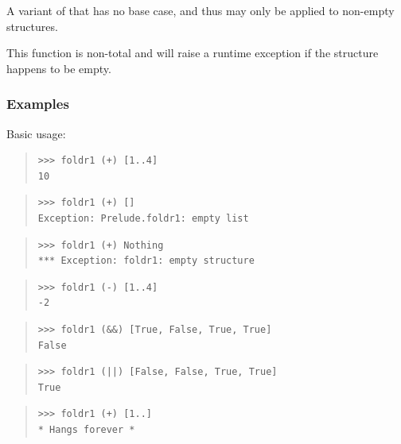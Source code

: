 \begin{haddockdesc}
\item[\begin{tabular}{@{}l}
foldr1 :: Foldable t => (a -> a -> a) -> t a -> a
\end{tabular}]
{\haddockbegindoc
A variant of  that has no base case,
 and thus may only be applied to non-empty structures.\par
This function is non-total and will raise a runtime exception if the
 structure happens to be empty.\par
\subsubsection*{\textbf{Examples}}
Basic usage:\par
\begin{quote}
{\haddockverb\begin{verbatim}
>>> foldr1 (+) [1..4]
10

\end{verbatim}}
\end{quote}
\begin{quote}
{\haddockverb\begin{verbatim}
>>> foldr1 (+) []
Exception: Prelude.foldr1: empty list

\end{verbatim}}
\end{quote}
\begin{quote}
{\haddockverb\begin{verbatim}
>>> foldr1 (+) Nothing
*** Exception: foldr1: empty structure

\end{verbatim}}
\end{quote}
\begin{quote}
{\haddockverb\begin{verbatim}
>>> foldr1 (-) [1..4]
-2

\end{verbatim}}
\end{quote}
\begin{quote}
{\haddockverb\begin{verbatim}
>>> foldr1 (&&) [True, False, True, True]
False

\end{verbatim}}
\end{quote}
\begin{quote}
{\haddockverb\begin{verbatim}
>>> foldr1 (||) [False, False, True, True]
True

\end{verbatim}}
\end{quote}
\begin{quote}
{\haddockverb\begin{verbatim}
>>> foldr1 (+) [1..]
* Hangs forever *

\end{verbatim}}
\end{quote}}
\end{haddockdesc}
